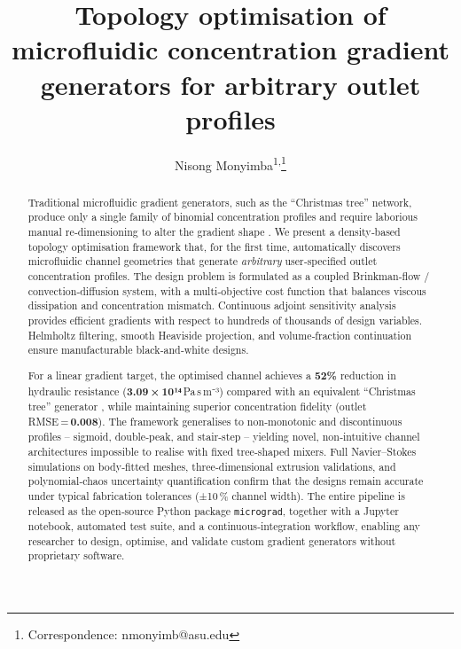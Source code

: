 \documentclass[12pt]{article}
\title{Topology optimisation of microfluidic concentration gradient generators for arbitrary outlet profiles}
\author{Nisong Monyimba\textsuperscript{1,}\thanks{Correspondence: nmonyimb@asu.edu}}
\date{}
\begin{document}
\maketitle

\begin{abstract}
Traditional microfluidic gradient generators, such as the ``Christmas tree'' network, produce only a single family of binomial concentration profiles and require laborious manual re‑dimensioning to alter the gradient shape \cite{jeon2005}. We present a density‑based topology optimisation framework that, for the first time, automatically discovers microfluidic channel geometries that generate \textit{arbitrary} user‑specified outlet concentration profiles. The design problem is formulated as a coupled Brinkman‑flow / convection‑diffusion system, with a multi‑objective cost function that balances viscous dissipation and concentration mismatch. Continuous adjoint sensitivity analysis provides efficient gradients with respect to hundreds of thousands of design variables. Helmholtz filtering, smooth Heaviside projection, and volume‑fraction continuation ensure manufacturable black‑and‑white designs.

For a linear gradient target, the optimised channel achieves a \textbf{52\%} reduction in hydraulic resistance (\textbf{3.09 × 10¹⁴} Pa s m⁻³) compared with an equivalent ``Christmas tree'' generator \cite{jeon2005}, while maintaining superior concentration fidelity (outlet RMSE = \textbf{0.008}). The framework generalises to non‑monotonic and discontinuous profiles – sigmoid, double‑peak, and stair‑step – yielding novel, non‑intuitive channel architectures impossible to realise with fixed tree‑shaped mixers. Full Navier–Stokes simulations on body‑fitted meshes, three‑dimensional extrusion validations, and polynomial‑chaos uncertainty quantification confirm that the designs remain accurate under typical fabrication tolerances (±10 \% channel width). The entire pipeline is released as the open‑source Python package \texttt{micrograd}, together with a Jupyter notebook, automated test suite, and a continuous‑integration workflow, enabling any researcher to design, optimise, and validate custom gradient generators without proprietary software.
\end{abstract}

\end{document}
